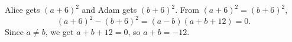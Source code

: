 Alice gets $(a+6)^2$ and Adam gets $(b+6)^2$. From $(a+6)^2=(b+6)^2$,
\[
(a+6)^2-(b+6)^2=(a-b)(a+b+12)=0 .
\]
Since $a\ne b$, we get $a+b+12=0$, so $a+b=\boxed{-12}$.
